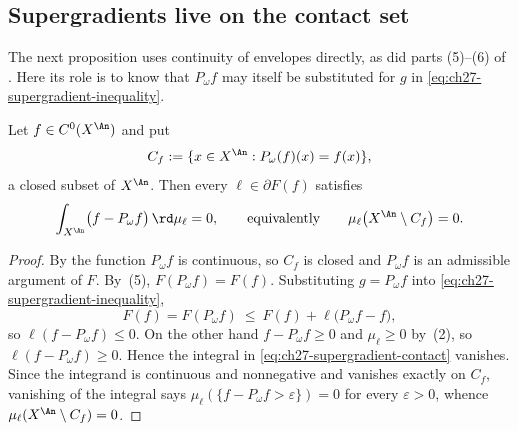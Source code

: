 \subsection{Supergradients live on the contact set}
\label{sec:ch27-contact-support}

The next proposition uses continuity of envelopes directly, as did
parts (5)--(6) of .  Here its role is to know that
$P_\omega f$ may itself be substituted for $g$ in
\eqref{eq:ch27-supergradient-inequality}.

\begin{proposition}
\label{prop:ch27-supergradients-on-contact}
Let $f\in C^0(X^{\An})$ and put
\begin{equation}\label{eq:ch27-contact-set}
 C_f:=\{x\in X^{\An}: P_\omega(f)(x)=f(x)\},
\end{equation}
a closed subset of $X^{\An}$.  Then every $\ell\in\partial F(f)$
satisfies
\begin{equation}\label{eq:ch27-supergradient-contact}
 \int_{X^{\An}}\bigl(f-P_\omega f\bigr)\,\rd\mu_\ell=0,
 \qquad\text{equivalently}\qquad
 \mu_\ell\bigl(X^{\An}\setminus C_f\bigr)=0 .
\end{equation}
\end{proposition}

\begin{proof}
By  the function $P_\omega f$ is
continuous, so $C_f$ is closed and $P_\omega f$ is an admissible
argument of $F$.  By \,(5),
$F(P_\omega f)=F(f)$.  Substituting $g=P_\omega f$ into
\eqref{eq:ch27-supergradient-inequality},
\[
 F(f)=F(P_\omega f)\ \leq\ F(f)+\ell\bigl(P_\omega f-f\bigr),
\]
so $\ell(f-P_\omega f)\leq0$.  On the other hand $f-P_\omega f\geq0$ and
$\mu_\ell\geq0$ by \,(2), so
$\ell(f-P_\omega f)\geq0$.  Hence the integral in
\eqref{eq:ch27-supergradient-contact} vanishes.  Since the integrand is
continuous and nonnegative and vanishes exactly on $C_f$, vanishing of the
integral says $\mu_\ell(\{f-P_\omega f>\varepsilon\})=0$ for every
$\varepsilon>0$, whence $\mu_\ell(X^{\An}\setminus C_f)=0$.
\end{proof}

\begin{center}
\end{center}

